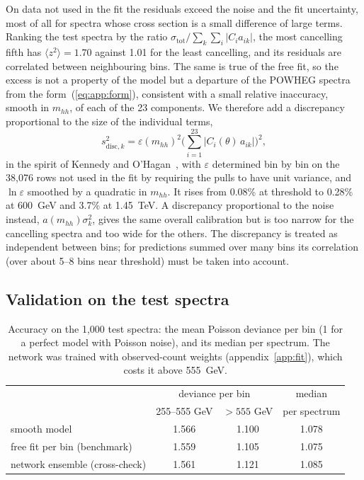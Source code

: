 On data not used in the fit the residuals exceed the noise and the fit uncertainty, most of all for
spectra whose cross section is a small difference of large terms. Ranking the test spectra by the
ratio $\sigma_\text{tot}/\sum_k\sum_i|C_ia_{ik}|$, the most cancelling fifth has
$\langle z^2\rangle = 1.70$ against 1.01 for the least cancelling, and its residuals are correlated
between neighbouring bins. The same is true of the free fit, so the excess is not a property of
the model but a departure of the POWHEG spectra from the form~(\ref{eq:app:form}), consistent with a
small relative inaccuracy, smooth in $m_{hh}$, of each of the 23 components. %
We therefore add a discrepancy proportional to the size of the individual terms,
\begin{equation}
  s_{\text{disc},k}^2 = \varepsilon(m_{hh})^2\Big(\sum_{i=1}^{23}|C_i(\theta)\,a_{ik}|\Big)^2 ,
  \label{eq:app:disc}
\end{equation}
in the spirit of Kennedy and O'Hagan~\cite{Kennedy:2001}, with $\varepsilon$ determined bin by bin on
the 38,076 rows not used in the fit by requiring the pulls to have unit variance, and $\ln\varepsilon$
smoothed by a quadratic in $m_{hh}$. It rises from 0.08\% at threshold to 0.28\% at 600~GeV and
3.7\% at 1.45~TeV. A discrepancy proportional to the noise instead, $a(m_{hh})\sigma_k^2$, gives the same
overall calibration but is too narrow for the cancelling spectra and too wide for the others. The
discrepancy is treated as independent between bins; for predictions summed over many bins its
correlation (over about 5--8 bins near threshold) must be taken into account.

\subsection{Validation on the test spectra}
\label{app:validation}

\begin{table}[t]
\centering
\small
\begin{tabular}{lccc}
\toprule
 & \multicolumn{2}{c}{deviance per bin} & median \\
 & 255--555 GeV & $>555$ GeV & per spectrum \\
\midrule
smooth model                            & 1.566 & 1.100 & 1.078 \\
free fit per bin (benchmark)            & 1.559 & 1.105 & 1.075 \\
network ensemble (cross-check)          & 1.561 & 1.121 & 1.085 \\
\bottomrule
\end{tabular}
\caption{Accuracy on the 1,000 test spectra: the mean Poisson deviance per bin (1 for a perfect
model with Poisson noise), and its median per spectrum. The network was trained with
observed-count weights (appendix~\ref{app:fit}), which costs it above 555~GeV.}
\label{tab:app:accuracy}
\end{table}

